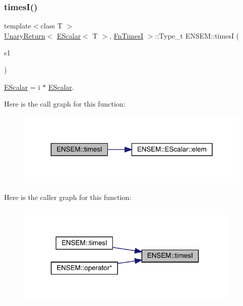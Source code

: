 \subsubsection{\texorpdfstring{timesI()}{timesI()}}
{\footnotesize\ttfamily template$<$class T $>$ \\
\mbox{\hyperlink{structENSEM_1_1UnaryReturn}{Unary\+Return}}$<$ \mbox{\hyperlink{classENSEM_1_1EScalar}{E\+Scalar}}$<$ T $>$, \mbox{\hyperlink{structENSEM_1_1FnTimesI}{Fn\+TimesI}} $>$\+::Type\+\_\+t E\+N\+S\+E\+M\+::timesI (\begin{DoxyParamCaption}\item[{const \mbox{\hyperlink{classENSEM_1_1EScalar}{E\+Scalar}}$<$ T $>$ \&}]{s1 }\end{DoxyParamCaption})\hspace{0.3cm}{\ttfamily [inline]}}



\mbox{\hyperlink{classENSEM_1_1EScalar}{E\+Scalar}} = i $\ast$ \mbox{\hyperlink{classENSEM_1_1EScalar}{E\+Scalar}}. 

Here is the call graph for this function\+:
\nopagebreak
\begin{figure}[H]
\begin{center}
\leavevmode
\includegraphics[width=319pt]{d4/dca/group__escalar_gab216ba6f292c204a04e5ff6cd34c32c3_cgraph}
\end{center}
\end{figure}
Here is the caller graph for this function\+:
\nopagebreak
\begin{figure}[H]
\begin{center}
\leavevmode
\includegraphics[width=298pt]{d4/dca/group__escalar_gab216ba6f292c204a04e5ff6cd34c32c3_icgraph}
\end{center}
\end{figure}
\mbox{\label{group__escalar_gaf2675acd80a7a861cff22098e403837a}} 
